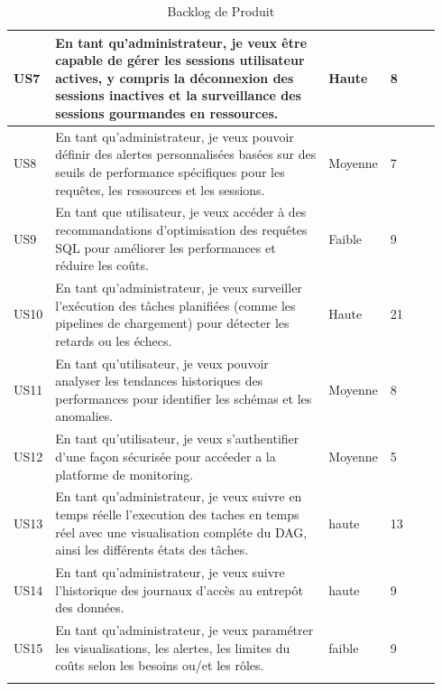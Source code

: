 \begin{center}
\begin{longtable}{|p{0.05\linewidth}|p{0.65\linewidth}|p{0.12\linewidth}|p{0.12\linewidth}|}
        \hline
        
        US7 &  En tant qu'administrateur, je veux être capable de gérer les sessions utilisateur actives, y compris la déconnexion des sessions inactives et la surveillance des sessions gourmandes en ressources. & Haute & 8 \\
        
        \hline
        
        US8 &  En tant qu'administrateur, je veux pouvoir définir des alertes personnalisées basées sur des seuils de performance spécifiques pour les requêtes, les ressources et les sessions. & Moyenne & 7 \\
        
        \hline
        
        US9 &  En tant que utilisateur, je veux accéder à des recommandations d'optimisation des requêtes SQL pour améliorer les performances et réduire les coûts. & Faible & 9 \\
        
        \hline
        
        US10& En tant qu'administrateur, je veux surveiller l'exécution des tâches planifiées (comme les pipelines de chargement) pour détecter les retards ou les échecs. & Haute & 21 \\
        
        \hline
        
        US11 & En tant qu'utilisateur, je veux pouvoir analyser les tendances historiques des performances pour identifier les schémas et les anomalies. & Moyenne & 8 \\
        
        \hline
        
        US12 & En tant qu'utilisateur, je veux s'authentifier d'une façon sécurisée pour accéeder a la platforme de monitoring. & Moyenne & 5 \\
        
        \hline
        US13 & En tant qu'administrateur, je veux suivre en temps réelle l'execution des taches en temps réel avec une visualisation compléte du DAG, ainsi les différents états des tâches.  & haute & 13 \\
        
        \hline
        US14 & En tant qu'administrateur, je veux suivre l'historique des journaux d'accès au entrepôt des données. & haute & 9 \\
        
        \hline
        US15 & En tant qu'administrateur, je veux paramétrer les visualisations, les alertes, les limites du coûts selon les besoins ou/et les rôles. & faible & 9 \\
        
        \hline
        
        \caption{Backlog de Produit}
        \label{tab:backlog_produit}
    \end{longtable}
    \par 

\end{center}
